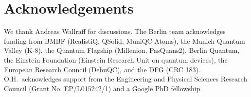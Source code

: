 \section{Acknowledgements}\label{sec:acknowledgements}

We thank Andreas Wallraff for discussions. The Berlin team
 acknowledges funding from BMBF (RealistiQ, QSolid, MuniQC-Atoms),
 the Munich Quantum Valley (K-8), the Quantum Flagship
 (Millenion, PasQuans2), Berlin Quantum, 
 the Einstein Foundation (Einstein Research Unit on 
 quantum devices),
 the European Research Council (DebuQC),
 and the DFG (CRC 183).
O.H.~acknowledges support from the Engineering and Physical
Sciences Research Council (Grant No. EP/L015242/1) and
a Google PhD fellowship.

